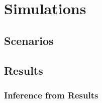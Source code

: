 
\chapter{Simulations}\label{chapter:simulations}

\section{Scenarios}
\section{Results}
\subsection{Inference from Results}